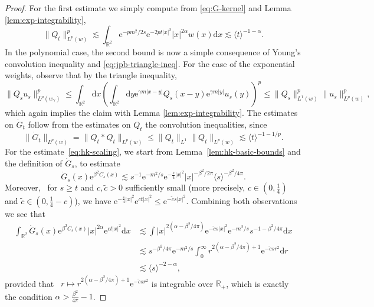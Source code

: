 \documentclass[11pt, a4paper]{scrartcl}
\numberwithin{equation}{section}
\theoremstyle{plain}
\theoremstyle{remark}
\newcommand{\mathd}{\mathrm{d}}
\newcommand{\mathe}{\mathrm{e}}
\begin{document}
\begin{proof}
	For the first estimate we simply compute from \eqref{eq:G-kernel} and Lemma
	\ref{lem:exp-integrability},
	\[ \| Q_t \|_{L^p (w)}^p \lesssim \int_{\mathbb{R}^2} \mathe^{- pm^2 / 2 s}
		\mathe^{- 2 pt | x |^2} | x |^{2 \alpha} w (x) \mathd x \lesssim \langle
		t \rangle^{- 1 - \alpha} . \]
	In the polynomial case, the second bound is now a simple consequence of
	Young's convolution inequality and \eqref{eq:jpb-triangle-ineq}. For the
	case of the exponential weights, observe that by the triangle inequality,
	\[ \| Q_s u_s \|_{L^p (w_{\gamma})}^p \leqslant \int_{\mathbb{R}^2} \mathd x
		\left( \int_{\mathbb{R}^2} \mathd y \mathe^{\gamma m | x - y |} Q_s (x -
		y) \mathe^{\gamma m | y |} u_s (y) \right)^p \leqslant \| Q_s \|^p_{L^1
				(w)} \| u_s \|_{L^p (w)}^p, \]
	which again implies the claim with Lemma \ref{lem:exp-integrability}. The
	estimates on $\dot{G}_t$ follow from the estimates on $Q_t$ the convolution
	inequalities, since
	\[ \| \dot{G}_t \|_{L^p (w)} = \| Q_t \ast Q_t \|_{L^p (w)} \leqslant \|
		Q_t \|_{L^1} \| Q_t \|_{L^p (w)} \lesssim \langle t \rangle^{- 1 - 1 / p}
		. \]
	For the estimate~\eqref{eq:hk-scaling}, we start from
	Lemma~\ref{lem:hk-basic-bounds} and the definition of $\dot{G}_s$, to
	estimate
	\[ \dot{G}_s (x) \mathe^{\beta^2 C_s (x)} \lesssim s^{- 1} \mathe^{- m^2 /
			s} \mathe^{- \frac{s}{4} | x |^2} | x |^{- \beta^2 / 2 \pi} \langle s
		\rangle^{- \beta^2 / 4 \pi} . \]
	Moreover, \ for $s \geqslant t$ and $c, \tilde{c} > 0$ sufficiently small
	(more precisely, $c \in \left( 0, \frac{1}{4} \right)$ and $\tilde{c} \in
		\left( 0, \frac{1}{4} - c \right)$), we have $\mathe^{- \frac{s}{4} | x |^2}
		\mathe^{c t | x |^2} \leqslant \mathe^{- \tilde{c} s | x |^2}$. Combining
	both observations we see that
	\[ \begin{aligned}
			\int_{\mathbb{R}^2} \dot{G}_s (x) \mathe^{\beta^2 C_s (x)} | x |^{2
			\alpha} \mathe^{c t | x |^2} \mathd x & \lesssim  \int | x |^{2
					(\alpha - \beta^2 / 4 \pi)} \mathe^{- \tilde{c} s | x |^2} \mathe^{-
			m^2 / s} s^{- 1 - \beta^2 / 4 \pi} \mathd x                                                                 \\
			                                      & \lesssim  s^{- \beta^2 / 4 \pi} \mathe^{- m^2 / s}  \int_0^{\infty}
			r^{2 (\alpha - \beta^2 / 4 \pi) + 1} \mathe^{- \tilde{c} s r^2} \mathd
			r                                                                                                           \\
			                                      & \lesssim  \langle s \rangle^{- 2 - \alpha},
		\end{aligned} \]
	provided that \ $r \mapsto r^{2 (\alpha - \beta^2 / 4 \pi) + 1} \mathe^{-
			\tilde{c} s r^2}$ is integrable over $\mathbb{R}_+$, which is exactly the
	condition $\alpha > \frac{\beta^2}{4 \pi} - 1$.
\end{proof}
\end{document}
